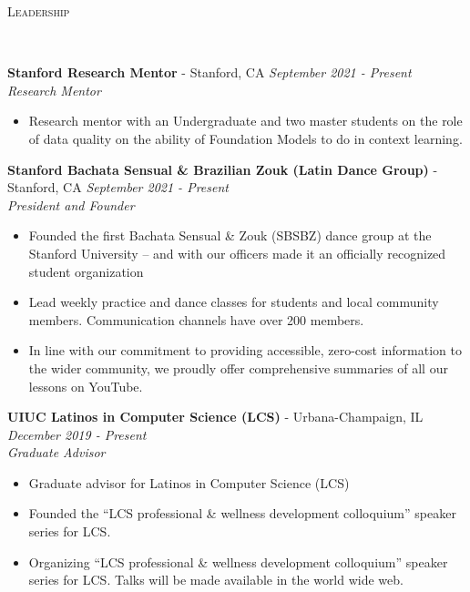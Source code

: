 \documentclass{article}
\newenvironment{changemargin}[2]{%
  \begin{list}{}{%
    \setlength{\topsep}{0pt}%
    \setlength{\leftmargin}{#1}%
    \setlength{\rightmargin}{#2}%
    \setlength{\listparindent}{\parindent}%
    \setlength{\itemindent}{\parindent}%
    \setlength{\parsep}{\parskip}%
  }%
  \item[]}{\end{list}
}
\newcommand{\lineover}{
	\begin{changemargin}{-0.05in}{-0.05in}
		\vspace*{-8pt}
		\hrulefill \\
		\vspace*{-2pt}
	\end{changemargin}
}
\newcommand{\header}[1]{
	\begin{changemargin}{-0.5in}{-0.5in}
		\scshape{#1}\\
  	\lineover
	\end{changemargin}
}
\newenvironment{body} {
	\vspace*{-16pt}
	\begin{changemargin}{-0.25in}{-0.5in}
  }	
	{\end{changemargin}
}
\begin{document}
\newpage

\header{Leadership}

\begin{body}

    \vspace{16pt}

      \textbf{Stanford Research Mentor} - Stanford, CA \hfill \emph{September 2021 - Present}\\
	\emph{Research Mentor}\\
	\vspace*{-3pt}
	\begin{itemize} \itemsep -2pt  %
    	\item Research mentor with an Undergraduate and two master students on the role of data quality on the ability of Foundation Models to do in context learning. 
	\end{itemize}
	\vspace{5 pt}

 	\textbf{Stanford Bachata Sensual \& Brazilian Zouk (Latin Dance Group)} - Stanford, CA \hfill \emph{September 2021 - Present}\\
	\emph{President and Founder}\\
	\vspace*{-3pt}
	\begin{itemize} \itemsep -2pt  %
    	\item Founded the first Bachata Sensual \& Zouk (SBSBZ) dance group at the Stanford University -- and with our officers made it an officially recognized student organization
    	\item Lead weekly practice and dance classes for students and local community members. Communication channels have over 200 members.
    	\item In line with our commitment to providing accessible, zero-cost information to the wider community, we proudly offer comprehensive summaries of all our lessons on YouTube.
	\end{itemize}
	\vspace{5 pt}
    
    \textbf{UIUC Latinos in Computer Science (LCS)} - Urbana-Champaign, IL \hfill \emph{December 2019 - Present}\\
	\emph{Graduate Advisor}\\
	\vspace*{-3pt}
	\begin{itemize} \itemsep -2pt  %
    	\item Graduate advisor for Latinos in Computer Science (LCS)
    	\item Founded the ``LCS professional \& wellness development colloquium'' speaker series for LCS.
    	\item Organizing ``LCS professional \& wellness development colloquium'' speaker series for LCS.
    	Talks will be made available in the world wide web.
	\end{itemize}
	\vspace{5 pt}
	

\end{body}
\end{document}
